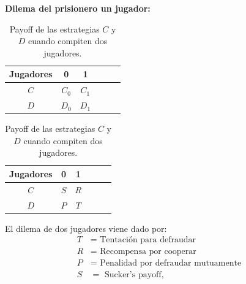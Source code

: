 \documentclass[twocolumn,aps,prl]{revtex4-1}
\begin{document}
\textbf{Dilema del prisionero un jugador:}


\begin{table}[!htb]
    \begin{subtable}{.5\linewidth}
      \centering
        \caption{}
        \begin{tabular}{c|ccccc}
            Jugadores & 0       & 1        \\ \hline
            $C$       & $C_{0}$ & $C_{1}$  \\ \hline
            $D$       & $D_{0}$ & $D_{1}$ 
            \end{tabular}
            \label{tab:my-table}
    \end{subtable}%
    \begin{subtable}{.5\linewidth}
      \centering
        \caption{}
        \begin{tabular}{c|ccccc}
            Jugadores & 0       & 1        \\ \hline
            $C$       & $S$ & $R$  \\ \hline
            $D$       & $P$ & $T$ 
            \end{tabular}
        \end{subtable} 
    \caption{Payoff de las estrategias $C$ y $D$ cuando compiten dos jugadores.}
    \label{tab:my-table}
\end{table}

El dilema de dos jugadores viene dado por:
$$
\begin{aligned}
    T &= \text{ Tentación para defraudar}\\
    R &= \text{ Recompensa por cooperar}\\
    P &= \text{ Penalidad por defraudar mutuamente}\\
    S &= \text{ Sucker's payoff},
\end{aligned}
$$
\end{document}
